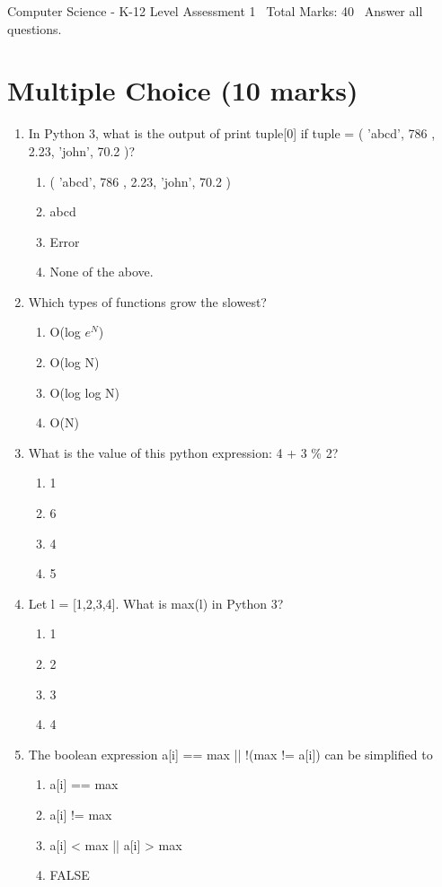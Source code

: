 \documentclass[12pt]{article}
\begin{document}
\begin{center}
Computer Science - K-12 Level Assessment 1 \
Total Marks: 40 \
Answer all questions.
\end{center}

\section*{Multiple Choice (10 marks)}
\begin{enumerate}[label=\arabic*.]
\item In Python 3, what is the output of print tuple[0] if tuple = ( 'abcd', 786 , 2.23, 'john', 70.2 )?
\begin{enumerate}[label=(\alph*)]
    \item ( 'abcd', 786 , 2.23, 'john', 70.2 )
    \item abcd
    \item Error
    \item None of the above.
\end{enumerate}
\item Which types of functions grow the slowest?
\begin{enumerate}[label=(\alph*)]
    \item O(log $e^N$)
    \item O(log N)
    \item O(log log N)
    \item O(N)
\end{enumerate}
\item What is the value of this python expression: 4 + 3 \% 2?
\begin{enumerate}[label=(\alph*)]
    \item 1
    \item 6
    \item 4
    \item 5
\end{enumerate}
\item Let l = [1,2,3,4]. What is max(l) in Python 3?
\begin{enumerate}[label=(\alph*)]
    \item 1
    \item 2
    \item 3
    \item 4
\end{enumerate}
\item The boolean expression a[i] == max || !(max != a[i]) can be simplified to
\begin{enumerate}[label=(\alph*)]
    \item a[i] == max
    \item a[i] != max
    \item a[i] \textless{} max || a[i] \textgreater{} max
    \item FALSE
\end{enumerate}
\end{enumerate}
\end{document}
